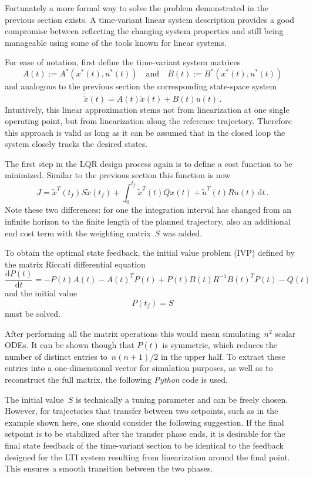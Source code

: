 \documentclass[a4paper,11pt,headinclude=true,headsepline,parskip=half,DIV=13]{scrartcl}
\newcommand{\py}{\emph{Python}\xspace}
\newcommand*\luainputlisting[2]{
    \luadirect{print_listing(\luastring{#1}, \luastring{#2})}
}
\begin{document}
Fortunately a more formal way to solve the problem demonstrated in the previous section exists.
A time-variant linear system description provides a good compromise between reflecting the changing system properties and still being manageable using some of the tools known for linear systems.

For ease of notation, first define the time-variant system matrices
$$
A(t):=A^*(x^*(t), u^*(t)) \quad \text{and} \quad B(t):=B^*(x^*(t),u^*(t))
$$
and analogous to the previous section the corresponding state-space system
$$
\dot{\tilde x}(t) = A(t)\tilde x(t) + B(t) u(t)\, .
$$
Intuitively, this linear approximation stems not from linearization at one single operating point, but from linearization along the reference trajectory.
Therefore this approach is valid as long as it can be assumed that in the closed loop the system closely tracks the desired states.

The first step in the LQR design process again is to define a cost function to be minimized.
Similar to the previous section this function is now
$$
J=\tilde x^T(t_f) S \tilde x(t_f) +\int_0^{t_f} \tilde x^T(t) Q x(t) + \tilde u^T(t) R u(t) \, \mathrm d t\, .
$$
Note these two differences: for one the integration interval has changed from an infinite horizon to the finite length of the planned trajectory, also an additional end cost term with the weighting matrix~$S$ was added.

To obtain the optimal state feedback, the initial value problem (IVP) defined by the matrix Riccati differential equation
\begin{equation}
\frac{\mathrm d P(t)}{\mathrm d t}= -P(t)A(t) - A(t)^T P(t) + P(t) B(t) R^{-1} B(t)^T P(t) - Q(t)
\label{eq:riccati_ivp}
\end{equation}
and the initial value
$$
P(t_f) = S
$$
must be solved.

After performing all the matrix operations this would mean simulating~$n^2$ scalar ODEs.
It can be shown though that $P(t)$ is symmetric, which reduces the number of distinct entries to~$n(n+1)/2$ in the upper half.
To extract these entries into a one-dimensional vector for simulation purposes, as well as to reconstruct the full matrix, the following \py code is used.
\luainputlisting{../sim/01_lqr.py}{triuconvert}

The initial value~$S$ is technically a tuning parameter and can be freely chosen.
However, for trajectories that transfer between two setpoints, such as in the example shown here, one should consider the following suggestion.
If the final setpoint is to be stabilized after the transfer phase ends, it is desirable for the final state feedback of the time-variant section to be identical to the feedback designed for the LTI system resulting from linearization around the final point.
This ensures a smooth transition between the two phases.
\end{document}
